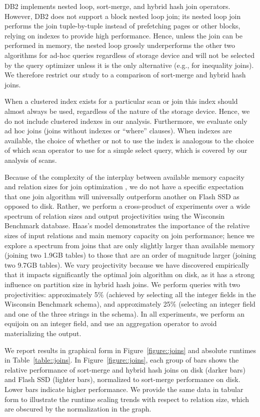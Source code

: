 DB2 implements nested loop, sort-merge, and hybrid hash join operators.  
However, DB2 does not support a block nested loop join; its nested loop join performs the join tuple-by-tuple instead of prefetching pages or other blocks, relying on indexes to provide high performance.
Hence, unless the join can be performed in memory, the nested loop grossly underperforms the other two algorithms for ad-hoc queries regardless of storage device and will not be selected by the query optimizer unless it is the only alternative (e.g., for inequality joins). 
We therefore restrict our study to a comparison of sort-merge and hybrid hash joins.

When a clustered index exists for a particular scan or join this index should almost always be used, regardless of the nature of the storage device.  
Hence, we do not include clustered indexes in our analysis.
Furthermore, we evaluate only ad hoc joins (joins without indexes or ``where'' clauses).
When indexes are available, the choice of whether or not to use the index is analogous to the choice of which scan operator to use for a simple select query, which is covered by our analysis of scans.

Because of the complexity of the interplay between available memory capacity and relation sizes for join optimization \cite{DBLP:journals/vldb/HaasCLS97}, we do not have a specific expectation that one join algorithm will universally outperform another on Flash SSD as opposed to disk.
Rather, we perform a cross-product of experiments over a wide spectrum of relation sizes and output projectivities using the Wisconsin Benchmark database.  
Haas's model demonstrates the importance of the relative sizes of input relations and main memory capacity on join performance; hence we explore a spectrum from joins that are only slightly larger than available memory (joining two 1.9GB tables) to those that are an order of magnitude larger (joining two 9.7GB tables).   
We vary projectivity because we have discovered empirically that it impacts significantly the optimal join algorithm on disk, as it has a strong influence on partition size in hybrid hash joins.
We perform queries with two projectivities: approximately 5\% (achieved by selecting all the integer fields in the Wisconsin Benchmark schema), and approximately 25\% (selecting an integer field and one of the three strings in the schema).
In all experiments, we perform an equijoin on an integer field, and use an aggregation operator to avoid materializing the output.

We report results in graphical form in Figure~\ref{figure::joins} and absolute runtimes in Table~\ref{table::joins}.
In Figure~\ref{figure::joins}, each group of bars shows the relative performance of sort-merge and hybrid hash joins on disk (darker bars) and Flash SSD (lighter bars), normalized to sort-merge performance on disk.
Lower bars indicate higher performance.
We provide the same data in tabular form to illustrate the runtime scaling trends with respect to relation size, which are obscured by the normalization in the graph.

